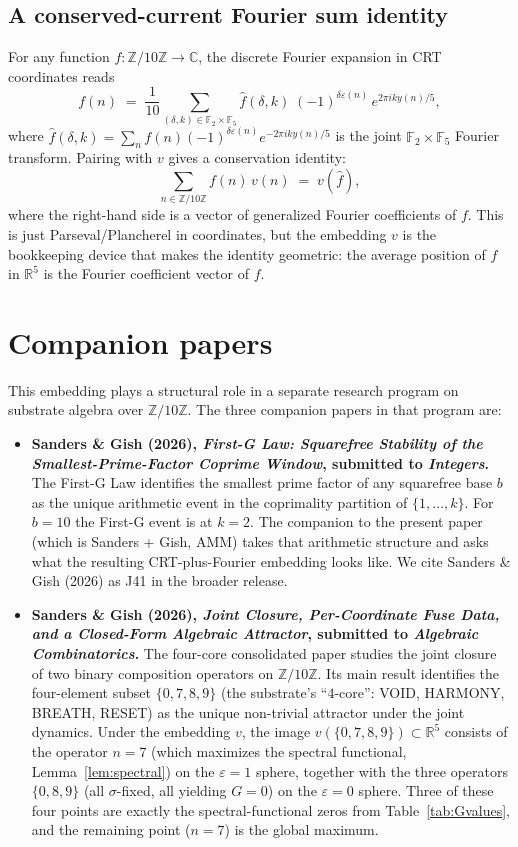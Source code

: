 \documentclass[11pt,reqno]{amsart}
\theoremstyle{definition}
\newcommand{\Z}{\mathbb{Z}}
\newcommand{\R}{\mathbb{R}}
\newcommand{\C}{\mathbb{C}}
\newcommand{\F}{\mathbb{F}}
\begin{document}
\subsection{A conserved-current Fourier sum identity}

For any function $f : \Z/10\Z \to \C$, the discrete Fourier
expansion in CRT coordinates reads
\[
  f(n) \;=\; \frac{1}{10} \sum_{(\delta, k) \in \F_2 \times \F_5}
  \widehat{f}(\delta, k)\;
  (-1)^{\delta \varepsilon(n)} \, e^{2\pi i k y(n) / 5},
\]
where $\widehat{f}(\delta, k) = \sum_n f(n) (-1)^{\delta
\varepsilon(n)} e^{-2\pi i k y(n) / 5}$ is the joint
$\F_2 \times \F_5$ Fourier transform. Pairing with $v$ gives a
conservation identity:
\[
  \sum_{n \in \Z/10\Z} f(n) \, v(n) \;=\; v(\widehat{f}),
\]
where the right-hand side is a vector of generalized Fourier
coefficients of $f$. This is just Parseval/Plancherel in
coordinates, but the embedding $v$ is the bookkeeping device that
makes the identity geometric: the average position of $f$ in
$\R^5$ is the Fourier coefficient vector of $f$.

\section{Companion papers}
\label{sec:companions}

This embedding plays a structural role in a separate research
program on substrate algebra over $\Z/10\Z$. The three
companion papers in that program are:

\begin{itemize}[leftmargin=*]
\item \textbf{Sanders \& Gish (2026), \emph{First-G Law: Squarefree
  Stability of the Smallest-Prime-Factor Coprime Window},
  submitted to \emph{Integers}.} The First-G Law identifies the
  smallest prime factor of any squarefree base $b$ as the unique
  arithmetic event in the coprimality partition of
  $\{1, \ldots, k\}$. For $b = 10$ the First-G event is at
  $k = 2$. The companion to the present paper (which is
  Sanders + Gish, AMM) takes that arithmetic structure and asks
  what the resulting CRT-plus-Fourier embedding looks like. We
  cite Sanders \& Gish (2026) as J41 in the broader release.
\item \textbf{Sanders \& Gish (2026), \emph{Joint Closure,
  Per-Coordinate Fuse Data, and a Closed-Form Algebraic Attractor},
  submitted to \emph{Algebraic Combinatorics}.} The four-core
  consolidated paper studies the joint closure of two binary
  composition operators on $\Z/10\Z$. Its main result identifies
  the four-element subset $\{0, 7, 8, 9\}$ (the substrate's
  ``$4$-core'': VOID, HARMONY, BREATH, RESET) as the unique
  non-trivial attractor under the joint dynamics. Under the
  embedding $v$, the image $v(\{0, 7, 8, 9\}) \subset \R^{5}$
  consists of the operator $n = 7$ (which maximizes the spectral
  functional, Lemma~\ref{lem:spectral}) on the
  $\varepsilon = 1$ sphere, together with the three operators
  $\{0, 8, 9\}$ (all $\sigma$-fixed, all yielding $G = 0$) on the
  $\varepsilon = 0$ sphere. Three of these four points are exactly
  the spectral-functional zeros from
  Table~\ref{tab:Gvalues}, and the remaining point ($n = 7$) is
  the global maximum.
\end{itemize}
\end{document}
